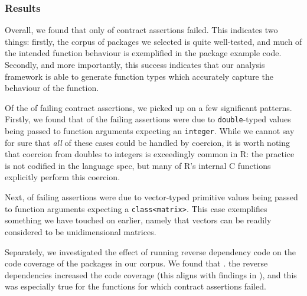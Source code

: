 \documentclass[acmsmall,review,anonymous]{acmart}\settopmatter{printfolios=true,printccs=false,printacmref=false}
\newcommand{\code}[1]{{\lstinline[style=Rin]!#1!}\xspace}
\begin{document}
%
%
\subsubsection{Results}


Overall, we found that only  of contract assertions failed.
This indicates two things: firstly, the corpus of packages we selected is quite well-tested, and much of the intended function behaviour is exemplified in the package example code. 
Secondly, and more importantly, this success indicates that our analysis framework is able to generate function types which accurately capture the behaviour of the function. 

Of the  of failing contract assertions, we picked up on a few significant patterns.
Firstly, we found that  of the failing assertions were due to \code{double}-typed values being passed to function arguments expecting an \code{integer}.
While we cannot say for sure that {\it all} of these cases could be handled by coercion, it is worth noting that coercion from doubles to integers is exceedingly common in R: the practice is not codified in the language spec, but many of R's internal C functions explicitly perform this coercion.

Next,  of failing assertions were due to vector-typed primitive values being passed to function arguments expecting a \code{class<matrix>}.
This case exemplifies something we have touched on earlier, namely that vectors can be readily considered to be unidimensional matrices.

Separately, we investigated the effect of running reverse dependency code on the code coverage of the packages in our corpus.
We found that . the reverse dependencies increased the code coverage (this aligns with findings in ), and this was especially true for the functions for which contract assertions failed.
\end{document}
